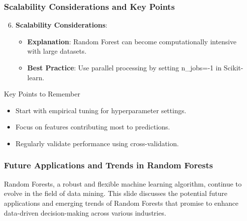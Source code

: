 \documentclass[aspectratio=169]{beamer}
\begin{document}
\begin{frame}
    \frametitle{Scalability Considerations and Key Points}
    \begin{enumerate}
        \setcounter{enumi}{5} %
        \item \textbf{Scalability Considerations}:
        \begin{itemize}
            \item \textbf{Explanation}: Random Forest can become computationally intensive with large datasets.
            \item \textbf{Best Practice}: Use parallel processing by setting n\_jobs=-1 in Scikit-learn.
        \end{itemize}
    \end{enumerate}

    \begin{block}{Key Points to Remember}
        \begin{itemize}
            \item Start with empirical tuning for hyperparameter settings.
            \item Focus on features contributing most to predictions.
            \item Regularly validate performance using cross-validation.
        \end{itemize}
    \end{block}
\end{frame}

\begin{frame}[fragile]
    \frametitle{Future Applications and Trends in Random Forests}
    Random Forests, a robust and flexible machine learning algorithm, continue to evolve in the field of data mining. 
    This slide discusses the potential future applications and emerging trends of Random Forests that promise to enhance data-driven decision-making across various industries.
\end{frame}
\end{document}
